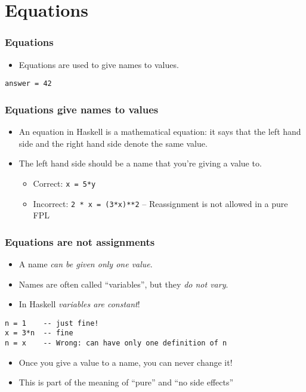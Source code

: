 \documentclass{beamer}
\begin{document}
\section{Equations}

\begin{frame}[fragile]
\frametitle{Equations}

\begin{itemize}
\item Equations are used to give names to values.
\end{itemize}

\begin{verbatim}
answer = 42
\end{verbatim}
\end{frame}

\begin{frame}
\frametitle{Equations give names to values}

\begin{itemize}
\item An equation in Haskell is a mathematical equation: it says
  that the left hand side and the right hand side denote the same
  value.
\item The left hand side should be a name that you're giving a
  value to.
  \begin{itemize}
  \item Correct: \texttt{x = 5*y}
  \item Incorrect: \texttt{2 * x = (3*x)**2} -- Reassignment is not allowed in a pure FPL
  \end{itemize}
\end{itemize}

\end{frame}

\begin{frame}[fragile]
\frametitle{Equations are not assignments}

\begin{itemize}
\item A name \emph{can be given only one value}.
\item Names are often called ``variables'', but they \emph{do not
    vary}.
\item In Haskell \emph{variables are constant}!
 
\end{itemize}

\begin{verbatim}
n = 1    -- just fine!
x = 3*n  -- fine
n = x    -- Wrong: can have only one definition of n
\end{verbatim}

\begin{itemize}
\item Once you give a value to a name, you can never change it!
\item This is part of the meaning of ``pure'' and
  ``no side effects''
\end{itemize}

\end{frame}
\end{document}
